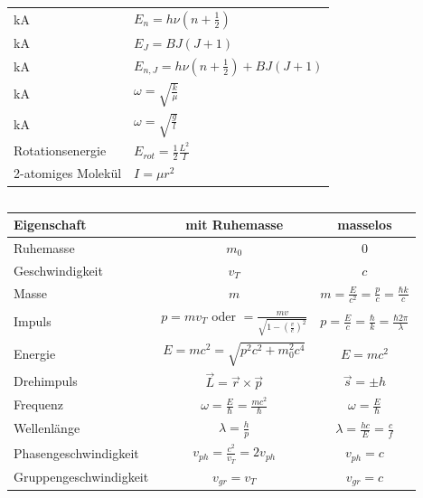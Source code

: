 \documentclass[12pt,a4paper]{article}
\renewcommand{\=}[1]{\stackrel{#1}{=}}
\theoremstyle{definition}
\theoremstyle{remark}
\begin{document}
\begin{center}
\begin{minipage}[t]{.35\linewidth}
\vspace{0pt}
\noindent\begin{tabular}{ll}
\toprule
kA & $E_n = h \nu (n+\frac{1}{2})$\\
kA & $E_J = BJ(J+1)$\\
kA & $E_{n,J} = h \nu (n+\frac{1}{2}) + BJ(J+1)$\\
kA & $\omega = \sqrt{\frac{k}{\mu}}$\\
kA & $\omega = \sqrt{\frac{g}{l}}$\\
Rotationsenergie & $E_{rot} = \frac{1}{2} \frac{L^2}{I}$\\
2-atomiges Molekül & $I = \mu r^2$\\
\bottomrule
\end{tabular}
\end{minipage}%
\begin{minipage}[t]{.65\linewidth}
\vspace{0pt}
\begin{tabular}{ll}
\toprule


\end{tabular}
\end{minipage}
\end{center}





\noindent



\noindent
\begin{tabular}{l|c|c}
Eigenschaft & mit Ruhemasse & masselos\\
\hline
Ruhemasse & $m_0$ & 0\\
Geschwindigkeit & $v_T$ & $c$\\
Masse & $m$ & $m = \frac{E}{c^2} = \frac{p}{c} = \frac{\hbar k}{c}$\\
Impuls & $p = mv_T$ oder $= \frac{mv}{\sqrt{1-(\frac{v}{c})^2}}$ & $p = \frac{E}{c} = \frac{\hbar}{k} = \frac{\hbar 2\pi}{\lambda}$\\
Energie & $E = mc^2 = \sqrt{p^2c^2 + m_0^2c^4}$ & $E = mc^2$\\
Drehimpuls & $\vec L = \vec r \times \vec p$ & $\vec s = \pm h$\\
Frequenz & $\omega = \frac{E}{\hbar} = \frac{mc^2}{\hbar}$ & $\omega = \frac{E}{\hbar}$\\
Wellenlänge & $\lambda = \frac{h}{p}$ & $\lambda = \frac{hc}{E} = \frac{c}{f}$\\
Phasengeschwindigkeit & $v_{ph} = \frac{c^2}{v_T} = 2v_{ph}$ & $v_{ph} = c$\\
Gruppengeschwindigkeit & $v_{gr} = v_T$ & $v_{gr} = c$
\end{tabular}
\end{document}
